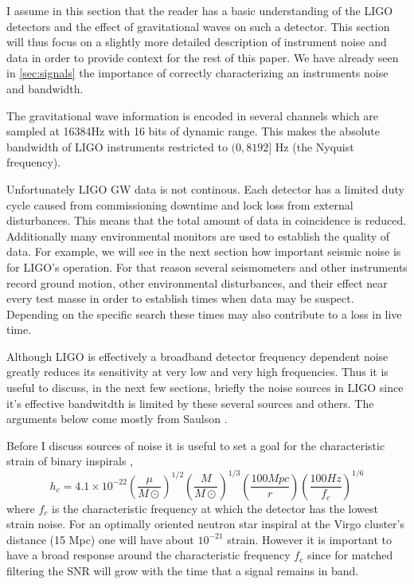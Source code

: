 \label{chapter2}
\doublespace

I assume in this section that the reader has a basic understanding of the LIGO detectors and the effect of gravitational waves on such a detector.  This section will thus
focus on a slightly more detailed description of instrument
noise and data in order to provide context for the rest of
this paper.  We have already seen in \ref{sec:signals} the 
importance of correctly characterizing an instruments noise
and bandwidth.


The gravitational wave information is encoded in several channels
which are sampled at 16384Hz with 16 bits of dynamic range.  
This makes the absolute bandwidth of LIGO instruments restricted
to $(0,8192]$ Hz (the Nyquist frequency). 

Unfortunately LIGO GW data is not continous.  Each detector
has a limited duty cycle caused from commissioning downtime and
lock loss from external disturbances.  This means that the
total amount of data in coincidence is reduced.  Additionally
many environmental monitors are used to establish the quality
of data.  For example, we will see in the next section how important 
seismic noise is for LIGO's operation.  For that reason several
seismometers and other instruments record ground motion, other environmental disturbances, and their effect near every test masse in order
to establish times when data may be suspect.  Depending on the
specific search these times may also contribute to a loss in
live time.  

Although LIGO is effectively a broadband detector frequency
dependent noise greatly reduces its sensitivity at very
low and very high frequencies.  Thus it is useful to discuss, in the next few 
sections, briefly the noise sources in LIGO since it's effective bandwitdth is limited by these several sources
and others.  The arguments below come mostly from Saulson \cite{Saulson}.

Before I discuss sources of noise it is useful to set a goal
for the characteristic strain of binary inspirals \cite{300years},
\begin{equation}
h_c = 4.1\times10^{-22}\left({\frac{\mu}{M\odot}}\right)^{1/2}\left({\frac{M}{M\odot}}\right)^{1/3}\left({\frac{100Mpc}{r}}\right)\left({\frac{100Hz}{f_c}}\right)^{1/6}
\end{equation}
where $f_c$ is the characteristic frequency at which the
detector has the lowest strain noise.  
For an optimally oriented neutron star inspiral at the Virgo cluster's distance (15 Mpc) one will
have about $10^{-21}$ strain.  However it is important to have
a broad response around the characteristic frequency $f_c$ since
for matched filtering the SNR will grow with the time that
a signal remains in band.

